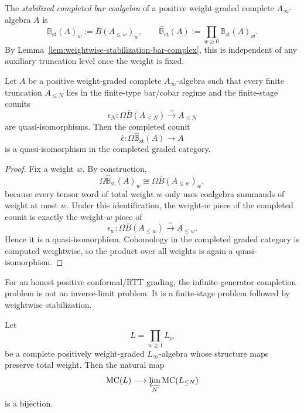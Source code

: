 \begin{definition}
\label{def:stabilized-completed-bar-coalgebra}
The \emph{stabilized completed bar coalgebra} of a positive weight-graded
complete $A_\infty$-algebra $A$ is
\[
\mathbb{B}_{\mathrm{st}}(A)_w:=\overline{B}(A_{\le w})_w,
\qquad
\widehat{\mathbb{B}}_{\mathrm{st}}(A):=\prod_{w\ge 0}\mathbb{B}_{\mathrm{st}}(A)_w.
\]
By Lemma~\ref{lem:weightwise-stabilization-bar-complex}, this is independent of
any auxiliary truncation level once the weight is fixed.
\end{definition}

\begin{theorem}
\label{thm:stabilized-completed-recovery}
Let $A$ be a positive weight-graded complete $A_\infty$-algebra such that every
finite truncation $A_{\le N}$ lies in the finite-type bar/cobar regime and the
finite-stage counits
\[
\epsilon_N\colon \Omega\overline{B}(A_{\le N})\xrightarrow{\sim} A_{\le N}
\]
are quasi-isomorphisms. Then the completed counit
\[
\widehat\epsilon\colon \Omega\widehat{\mathbb{B}}_{\mathrm{st}}(A)
\longrightarrow A
\]
is a quasi-isomorphism in the completed graded category.
\end{theorem}

\begin{proof}
Fix a weight $w$. By construction,
\[
\Omega\widehat{\mathbb{B}}_{\mathrm{st}}(A)_w
\cong
\Omega\overline{B}(A_{\le w})_w,
\]
because every tensor word of total weight $w$ only uses coalgebra summands of
weight at most $w$. Under this identification, the weight-$w$ piece of the
completed counit is exactly the weight-$w$ piece of
\[
\epsilon_w\colon \Omega\overline{B}(A_{\le w})\xrightarrow{\sim} A_{\le w}.
\]
Hence it is a quasi-isomorphism. Cohomology in the completed graded category is
computed weightwise, so the product over all weights is again a
quasi-isomorphism.
\end{proof}

\begin{corollary}
\label{cor:automatic-tower-convergence-positive-degree}
For an honest positive conformal/RTT grading, the infinite-generator completion
problem is not an inverse-limit problem. It is a finite-stage problem followed
by weightwise stabilization.
\end{corollary}

\begin{theorem}
\label{thm:weightwise-maurer-cartan-descent}
Let
\[
L=\prod_{w\ge 1}L_w
\]
be a complete positively weight-graded $L_\infty$-algebra whose structure maps
preserve total weight. Then the natural map
\[
\operatorname{MC}(L)\longrightarrow \varprojlim_N \operatorname{MC}(L_{\le N})
\]
is a bijection.
\end{theorem}


